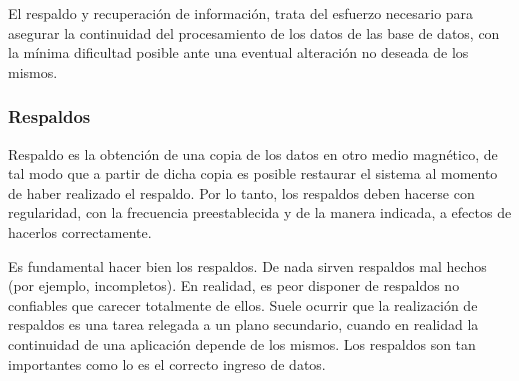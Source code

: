 \documentclass[a4paper,openright,12pt]{book}
\begin{document}
El respaldo y recuperación de información, trata del esfuerzo necesario para asegurar la continuidad del procesamiento de los datos de las base de datos, con la mínima dificultad posible ante una eventual alteración no deseada de los mismos.

\subsubsection{Respaldos}

Respaldo es la obtención de una copia de los datos en otro medio magnético, de tal modo que a partir de dicha copia es posible restaurar el sistema al momento de haber realizado el respaldo. Por lo tanto, los respaldos deben hacerse con regularidad, con la frecuencia preestablecida y de la manera indicada, a efectos de hacerlos correctamente.

Es fundamental hacer bien los respaldos. De nada sirven respaldos mal hechos (por ejemplo, incompletos). En realidad, es peor disponer de respaldos no confiables que carecer totalmente de ellos. Suele ocurrir que la realización de respaldos es una tarea relegada a un plano secundario, cuando en realidad la continuidad de una aplicación depende de los mismos. Los respaldos son tan importantes como lo es el correcto ingreso de datos.
\end{document}
